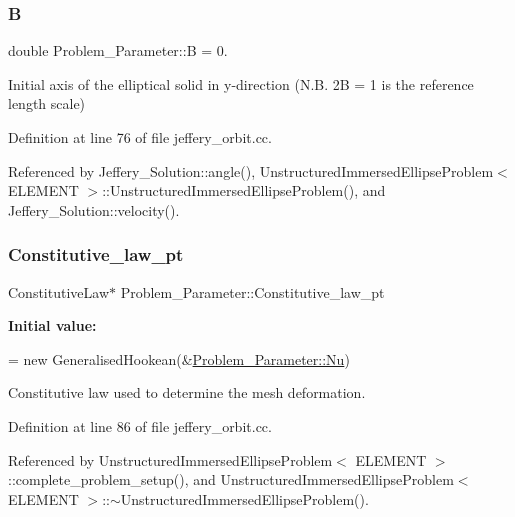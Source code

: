 \mbox{\label{namespaceProblem__Parameter_ac2362a46222574a21338a113e2bee27e}} 
\subsubsection{\texorpdfstring{B}{B}}
{\footnotesize\ttfamily double Problem\+\_\+\+Parameter\+::B = 0.}

Initial axis of the elliptical solid in y-\/direction (N.\+B. 2B = 1 is the reference length scale) 

Definition at line 76 of file jeffery\+\_\+orbit.\+cc.



Referenced by Jeffery\+\_\+\+Solution\+::angle(), Unstructured\+Immersed\+Ellipse\+Problem$<$ E\+L\+E\+M\+E\+N\+T $>$\+::\+Unstructured\+Immersed\+Ellipse\+Problem(), and Jeffery\+\_\+\+Solution\+::velocity().

\mbox{\label{namespaceProblem__Parameter_a9852a6077458693983628319d429f11f}} 
\subsubsection{\texorpdfstring{Constitutive\+\_\+law\+\_\+pt}{Constitutive\_law\_pt}}
{\footnotesize\ttfamily Constitutive\+Law$\ast$ Problem\+\_\+\+Parameter\+::\+Constitutive\+\_\+law\+\_\+pt}

{\bfseries Initial value\+:}
\begin{DoxyCode}
=   
   \textcolor{keyword}{new} GeneralisedHookean(&\hyperlink{namespaceProblem__Parameter_abec2e733c8f2d3c18ebc702b3f80cc17}{Problem\_Parameter::Nu})
\end{DoxyCode}


Constitutive law used to determine the mesh deformation. 



Definition at line 86 of file jeffery\+\_\+orbit.\+cc.



Referenced by Unstructured\+Immersed\+Ellipse\+Problem$<$ E\+L\+E\+M\+E\+N\+T $>$\+::complete\+\_\+problem\+\_\+setup(), and Unstructured\+Immersed\+Ellipse\+Problem$<$ E\+L\+E\+M\+E\+N\+T $>$\+::$\sim$\+Unstructured\+Immersed\+Ellipse\+Problem().

